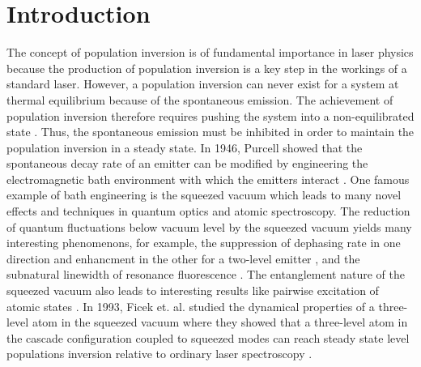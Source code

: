 \documentclass[aps,showpacs,twocolumn,twoside,groupedaddress]{revtex4}
\begin{document}
\section{Introduction}
The concept of population inversion is of fundamental importance in laser physics because the production of population inversion is a key step in the workings of a standard laser. However, a population inversion can never exist for a system at thermal equilibrium because of the spontaneous emission. The achievement of population inversion therefore requires pushing the system into a non-equilibrated state \cite{svelto1998principles}. Thus, the spontaneous emission must be inhibited in order to maintain the population inversion in a steady state. In 1946, Purcell showed that the spontaneous decay rate of an emitter can be modified by engineering the electromagnetic bath environment with which the emitters interact \cite{purcell1946purcell}. One famous example of bath engineering is the squeezed vacuum which leads to many novel effects and techniques in quantum optics and atomic spectroscopy. The reduction of quantum fluctuations below vacuum level by the squeezed vacuum yields many interesting phenomenons, for example, the suppression of dephasing rate in one direction and enhancment in the other for a two-level emitter \cite{gardiner1986cw, collett1984mj,gea1988vacuum,palma1989gm, agarwal1990cooperative, ficek1990spontaneous,ficek1991z, goldstein1996ev}, and the subnatural linewidth of resonance fluorescence \cite{carmichael1987, toyli2016resonance}. The entanglement nature of the squeezed vacuum also leads to interesting results like pairwise excitation of atomic states \cite{tanas2004stationary, li2006preparing, You2018}. In 1993, Ficek et. al. studied the dynamical properties of a three-level atom in the squeezed vacuum where they showed that a three-level atom in the cascade configuration coupled to squeezed modes can reach steady state level populations inversion relative to ordinary laser spectroscopy \cite{ficek1991three, ficek1993two}. 
\end{document}

